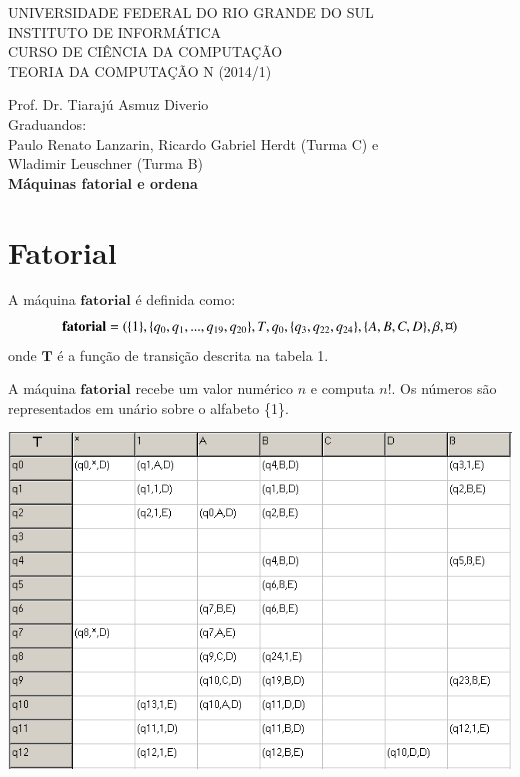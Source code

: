 \documentclass[a4paper]{article}
\begin{document}
\begin{center}


\uppercase{\large Universidade Federal do Rio Grande do Sul\\

\large Instituto de Informática \\

\large Curso de Ciência da Computação \\

\large Teoria da Computação N (2014/1)\\
}

\large Prof. Dr. Tiarajú Asmuz Diverio \\

\large Graduandos: \\ Paulo Renato Lanzarin, Ricardo Gabriel Herdt (Turma C) e \\
	Wladimir Leuschner (Turma B) \\[1cm]

\large \bfseries Máquinas fatorial e ordena \\[1.0cm]




\end{center}


\section{Fatorial}
A máquina $\mathbf{fatorial}$ é definida como:
\begin{equation*}
\mathbf{fatorial} = (\{1\}, \{q_0, q_1, ..., q_{19}, q_{20}\}, T, q_0,
\{q_3, q_{22}, q_{24}\}, \{A, B, C, D\}, \beta, \text{\textcurrency} )\end{equation*} onde $\mathbf{T}$ é a função de transição descrita na tabela 1.

A máquina $\mathbf{fatorial}$ recebe um valor numérico $n$ e computa $n!$. Os 
números são representados em unário sobre o alfabeto \{1\}. \\[1.0cm]

\begin{table}[h!]
  \centering
  \includegraphics[scale=0.5]{fatorial_1.png}
\end{table}
\end{document}
